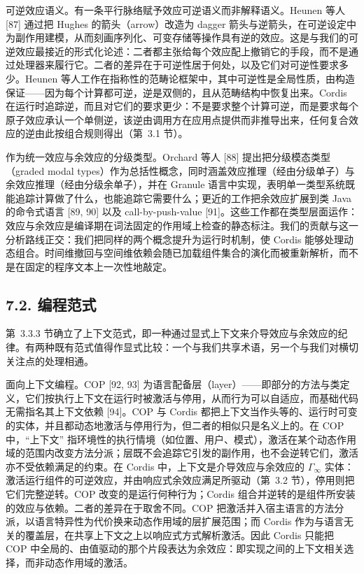 可逆效应语义。有一条平行脉络赋予效应可逆语义而非解释语义。Heunen 等人 {[}87{]} 通过把 Hughes 的箭头（arrow）改造为 dagger 箭头与逆箭头，在可逆设定中为副作用建模，从而刻画序列化、可变存储等操作具有逆的效应。这是与我们的可逆效应最接近的形式化论述：二者都主张给每个效应配上撤销它的手段，而不是通过处理器来履行它。二者的差异在于可逆性居于何处，以及它们对可逆性要求多少。Heunen 等人工作在指称性的范畴论框架中，其中可逆性是全局性质，由构造保证——因为每个计算都可逆，逆是双侧的，且从范畴结构中恢复出来。Cordis 在运行时追踪逆，而且对它们的要求更少：不是要求整个计算可逆，而是要求每个原子效应承认一个单侧逆，该逆由调用方在应用点提供而非推导出来，任何复合效应的逆由此按组合规则得出（第~3.1 节）。

作为统一效应与余效应的分级类型。Orchard 等人 {[}88{]} 提出把分级模态类型（graded modal types）作为总括性概念，同时涵盖效应推理（经由分级单子）与余效应推理（经由分级余单子），并在 Granule 语言中实现，表明单一类型系统既能追踪计算做了什么，也能追踪它需要什么；更近的工作把余效应扩展到类 Java 的命令式语言 {[}89, 90{]} 以及 call-by-push-value {[}91{]}。这些工作都在类型层面运作：效应与余效应是编译期在词法固定的作用域上检查的静态标注。我们的贡献与这一分析路线正交：我们把同样的两个概念提升为运行时机制，使 Cordis 能够处理动态组合。时间维撤回与空间维依赖会随已加载组件集合的演化而被重新解析，而不是在固定的程序文本上一次性地敲定。

\subsection{7.2. 编程范式}\label{programming-paradigms}

第~3.3.3 节确立了上下文范式，即一种通过显式上下文来介导效应与余效应的纪律。有两种既有范式值得作显式比较：一个与我们共享术语，另一个与我们对横切关注点的处理相通。

面向上下文编程。COP {[}92, 93{]} 为语言配备层（layer）——即部分的方法与类定义，它们按执行上下文在运行时被激活与停用，从而行为可以自适应，而基础代码无需指名其上下文依赖 {[}94{]}。COP 与 Cordis 都把上下文当作头等的、运行时可变的实体，并且都动态地激活与停用行为，但二者的相似只是名义上的。在 COP 中，``上下文'' 指环境性的执行情境（如位置、用户、模式），激活在某个动态作用域的范围内改变方法分派；层既不会追踪它引发的副作用，也不会逆转它们，激活亦不受依赖满足的约束。在 Cordis 中，上下文是介导效应与余效应的 \(\Gamma _ { \infty }\) 实体：激活运行组件的可逆效应，并由响应式余效应满足所驱动（第~3.2 节），停用则把它们完整逆转。COP 改变的是运行何种行为；Cordis 组合并逆转的是组件所安装的效应与依赖。二者的差异在于取舍不同。COP 把激活并入宿主语言的方法分派，以语言特异性为代价换来动态作用域的层扩展范围；而 Cordis 作为与语言无关的覆盖层，在共享上下文之上以响应式方式解析激活。因此 Cordis 只能把 COP 中全局的、由值驱动的那个片段表达为余效应：即实现之间的上下文相关选择，而非动态作用域的激活。

